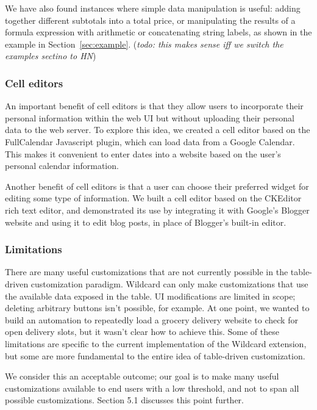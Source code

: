 \documentclass[sigplan,screen,10pt,anonymous,review]{acmart}
\begin{document}
We have also found instances where simple data manipulation is useful:
adding together different subtotals into a total price, or manipulating
the results of a formula expression with arithmetic or concatenating
string labels, as shown in the example in Section~\ref{sec:example}.
(\emph{todo: this makes sense iff we switch the examples sectino to HN})

\hypertarget{cell-editors}{%
\subsubsection{Cell editors}\label{cell-editors}}

An important benefit of cell editors is that they allow users to
incorporate their personal information within the web UI but without
uploading their personal data to the web server. To explore this idea,
we created a cell editor based on the FullCalendar Javascript plugin,
which can load data from a Google Calendar. This makes it convenient to
enter dates into a website based on the user's personal calendar
information.

Another benefit of cell editors is that a user can choose their
preferred widget for editing some type of information. We built a cell
editor based on the CKEditor rich text editor, and demonstrated its use
by integrating it with Google's Blogger website and using it to edit
blog posts, in place of Blogger's built-in editor.

\hypertarget{limitations}{%
\subsubsection{Limitations}\label{limitations}}

There are many useful customizations that are not currently possible in
the table-driven customization paradigm. Wildcard can only make
customizations that use the available data exposed in the table. UI
modifications are limited in scope; deleting arbitrary buttons isn't
possible, for example. At one point, we wanted to build an automation to
repeatedly load a grocery delivery website to check for open delivery
slots, but it wasn't clear how to achieve this. Some of these
limitations are specific to the current implementation of the Wildcard
extension, but some are more fundamental to the entire idea of
table-driven customization.

We consider this an acceptable outcome; our goal is to make many useful
customizations available to end users with a low threshold, and not to
span all possible customizations. Section 5.1 discusses this point
further.
\end{document}
